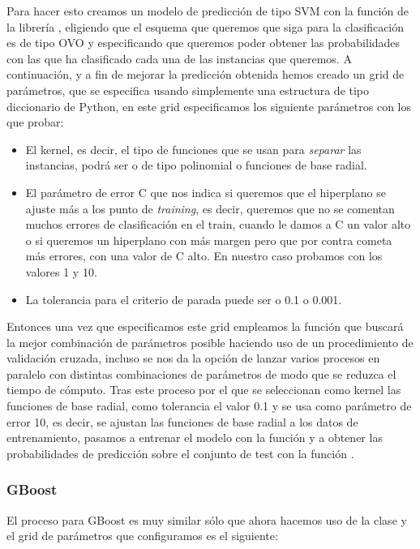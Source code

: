 Para hacer esto creamos un modelo de predicción de tipo SVM con la función  de la librería , eligiendo que el esquema que queremos que siga para la clasificación es de tipo OVO y especificando que queremos poder obtener las probabilidades con las que ha clasificado cada una de las instancias que queremos. A continuación, y a fin de mejorar la predicción obtenida hemos creado un grid de parámetros, que se especifica usando simplemente una estructura de tipo diccionario de Python, en este grid especificamos los siguiente parámetros con los que probar:

\begin{itemize}
\item El kernel, es decir, el tipo de funciones que se usan para \textit{separar} las instancias, podrá ser o de tipo polinomial o funciones de base radial.
\item El parámetro de error C que nos indica si queremos que el hiperplano se ajuste más a los punto de \textit{training}, es decir, queremos que no se comentan muchos errores de clasificación en el train, cuando le damos a C un valor alto o si queremos un hiperplano con más margen pero que por contra cometa más errores, con una valor de C alto. En nuestro caso probamos con los valores 1 y 10.
\item La tolerancia para el criterio de parada puede ser o 0.1 o 0.001.
\end{itemize}

Entonces una vez que especificamos este grid empleamos la función  que buscará la mejor combinación de parámetros posible haciendo uso de un procedimiento de validación cruzada, incluso se nos da la opción de lanzar varios procesos en paralelo con distintas combinaciones de parámetros de modo que se reduzca el tiempo de cómputo. Tras este proceso por el que se seleccionan como kernel las funciones de base radial, como tolerancia el valor 0.1 y se usa como parámetro de error 10, es decir, se ajustan las funciones de base radial a los datos de entrenamiento, pasamos a entrenar el modelo con la función  y a obtener las probabilidades de predicción sobre el conjunto de test con la función .

\subsubsection{GBoost}

El proceso para GBoost es muy similar sólo que ahora hacemos uso de la clase  y el grid de parámetros que configuramos es el siguiente:

